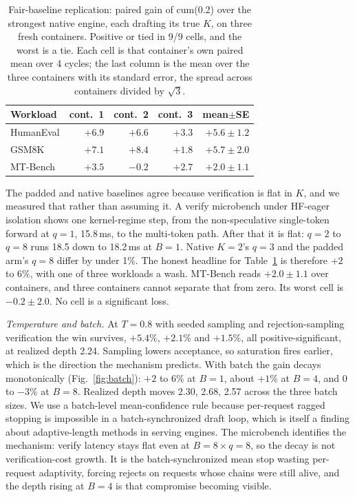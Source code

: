 \documentclass[conference]{IEEEtran}
\begin{document}
\begin{table}[t]
\caption{Fair-baseline replication: paired gain of cum(0.2) over the strongest native engine,
each drafting its true $K$, on three fresh containers. Positive or tied in 9/9 cells, and the
worst is a tie. Each cell is that container's own paired mean over 4 cycles; the last column
is the mean over the three containers with its standard error, the spread across containers
divided by $\sqrt{3}$.}
\label{tab:fairbase}
\centering
\small
\setlength{\tabcolsep}{4pt}
\begin{tabular}{lrrrr}
\toprule
Workload & cont.\ 1 & cont.\ 2 & cont.\ 3 & mean$\pm$SE \\
\midrule
HumanEval & $+6.9$ & $+6.6$ & $+3.3$ & $+5.6{\pm}1.2$ \\
GSM8K & $+7.1$ & $+8.4$ & $+1.8$ & $+5.7{\pm}2.0$ \\
MT-Bench & $+3.5$ & $-0.2$ & $+2.7$ & $+2.0{\pm}1.1$ \\
\bottomrule
\end{tabular}
\end{table}

The padded and native baselines agree because verification is flat in $K$, and we measured
that rather than assuming it. A verify microbench under HF-eager isolation shows one
kernel-regime step, from the non-speculative single-token forward at $q{=}1$, 15.8\,ms, to the
multi-token path. After that it is flat: $q{=}2$ to $q{=}8$ runs 18.5 down to 18.2\,ms at
$B{=}1$.
Native $K{=}2$'s $q{=}3$ and the padded arm's $q{=}8$ differ by under 1\%. The honest headline
for Table~\ref{tab:fairbase} is therefore $+2$ to $6\%$, with one of three workloads a wash.
MT-Bench reads $+2.0\pm1.1$ over containers, and three containers cannot separate that from
zero. Its worst cell is $-0.2\pm2.0$. No cell is a significant loss.

\emph{Temperature and batch.} At $T{=}0.8$ with seeded sampling and rejection-sampling
verification the win survives, $+5.4\%$, $+2.1\%$ and $+1.5\%$, all positive-significant, at
realized depth 2.24. Sampling lowers acceptance, so saturation fires earlier, which is the
direction the mechanism predicts. With batch the gain decays monotonically
(Fig.~\ref{fig:batch}): $+2$ to $6\%$ at $B{=}1$, about $+1\%$ at $B{=}4$, and 0 to $-3\%$ at
$B{=}8$. Realized depth moves 2.30, 2.68, 2.57 across the three batch sizes. We use a
batch-level
mean-confidence rule because per-request ragged stopping is impossible in a batch-synchronized
draft loop, which is itself a finding about adaptive-length methods in serving engines. The
microbench identifies the mechanism: verify latency stays flat even at $B{=}8\times q{=}8$, so
the decay is not verification-cost growth. It is the batch-synchronized mean stop wasting
per-request adaptivity, forcing rejects on requests whose chains were still alive, and the
depth rising at $B{=}4$ is that compromise becoming visible.
\end{document}
